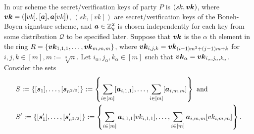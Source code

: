 %
%
%

In our scheme the secret/verification keys of party $P$ is $(sk,{\boldsymbol{vk}})$, where ${\boldsymbol{vk}}=([vk],[{\boldsymbol{a}}],{\boldsymbol{a}}[vk])$, $(sk,[vk])$ are secret/verification keys of the Boneh-Boyen signature scheme, and ${\boldsymbol{a}}\in\mathbb{Z}_q^2$ is chosen independently for each key from some distribution $\mathcal{Q}$ to be specified later. Suppose that ${\boldsymbol{vk}}$ is the $\alpha$ th element in the ring $R=\{{\boldsymbol{vk}}_{1,1,1},\ldots,{\boldsymbol{vk}}_{m,m,m}\}$, where ${\boldsymbol{vk}}_{i,j,k}={\boldsymbol{vk}}_{(i-1)m^2+(j-1)m+k}$ for $i,j,k\in[m],m:=\sqrt[3]{n}$. Let $i_\alpha,j_\alpha,k_\alpha\in[m]$ such that ${\boldsymbol{vk}}_\alpha = {\boldsymbol{vk}}_{i_\alpha,j_\alpha,k_\alpha}$. Consider the sets
\begin{align*}
&S:=\{[{\boldsymbol{s}}_1],\ldots,[{\boldsymbol{s}}_{n^{2/3}}]\}:=\left\{\sum_{i\in[m]}[{\boldsymbol{a}}_{i,1,1}],\ldots,\sum_{i\in[m]}[{\boldsymbol{a}}_{i,m,m}]\right\}\text{ and }\\
&S':=\{[{\boldsymbol{s}}'_1],\ldots,[{\boldsymbol{s}}'_{n^{2/3}}]\}:=\left\{\sum_{i\in[m]}{\boldsymbol{a}}_{i,1,1}[vk_{i,1,1}],\ldots,\sum_{i\in[m]}{\boldsymbol{a}}_{i,m,m}[vk_{i,m,m}]\right\}.
\end{align*}

